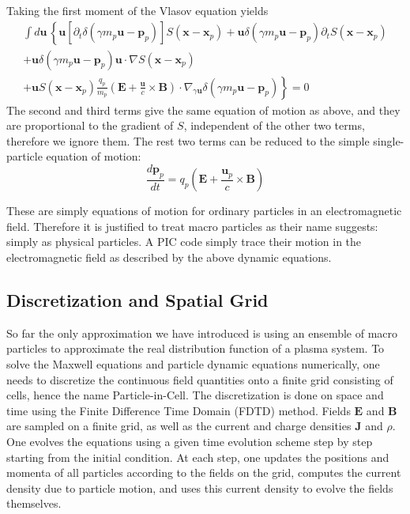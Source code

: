 Taking the first moment of the Vlasov equation yields
\begin{equation}
\begin{split}
    \int d\mathbf{u}\,\left\{ \mathbf{u}\left[ \partial_t \delta(\gamma m_{p}\mathbf{u} - \mathbf{p}_p) \right]S(\mathbf{x} - \mathbf{x}_p) + \mathbf{u}\delta(\gamma m_{p}\mathbf{u} - \mathbf{p}_p)\partial_tS(\mathbf{x} - \mathbf{x}_p) \right. \\
    + \mathbf{u}\delta(\gamma m_{p}\mathbf{u} - \mathbf{p}_p) \mathbf{u}\cdot\nabla S(\mathbf{x} - \mathbf{x}_p) \\
    \left. + \mathbf{u}S(\mathbf{x} - \mathbf{x}_p)\frac{q_p}{m_p}\left(\mathbf{E} + \frac{\mathbf{u}}{c}\times \mathbf{B}\right)\cdot \nabla_{\gamma \mathbf{u}}\delta(\gamma m_{p}\mathbf{u} - \mathbf{p}_p) \right\} = 0
\end{split}
\end{equation}
The second and third terms give the same equation of motion as above, and they
are proportional to the gradient of $S$, independent of the other two terms,
therefore we ignore them. The rest two terms can be reduced to the simple
single-particle equation of motion:
\begin{equation}
  \label{eq:eom-momentum}
\frac{d\mathbf{p}_p}{dt} = q_p\left(\mathbf{E} + \frac{\mathbf{u}_{p}}{c}\times \mathbf{B} \right)
\end{equation}

These are simply equations of motion for ordinary particles in an
electromagnetic field. Therefore it is justified to treat macro particles as
their name suggests: simply as physical particles. A PIC code simply trace their
motion in the electromagnetic field as described by the above dynamic equations.


\subsection{Discretization and Spatial Grid}
\label{sec:discretization}

So far the only approximation we have introduced is using an ensemble of macro
particles to approximate the real distribution function of a plasma system. To
solve the Maxwell equations and particle dynamic equations numerically, one
needs to discretize the continuous field quantities onto a finite grid
consisting of cells, hence the name Particle-in-Cell. The discretization is done
on space and time using the Finite Difference Time Domain (FDTD)
method. %
Fields $\mathbf{E}$ and $\mathbf{B}$ are sampled on a finite grid, as well as
the current and charge densities $\mathbf{J}$ and $\rho$. One evolves the
equations using a given time evolution scheme step by step starting from the
initial condition. At each step, one updates the positions and momenta of all
particles according to the fields on the grid, computes the current density due
to particle motion, and uses this current density to evolve the fields
themselves.


